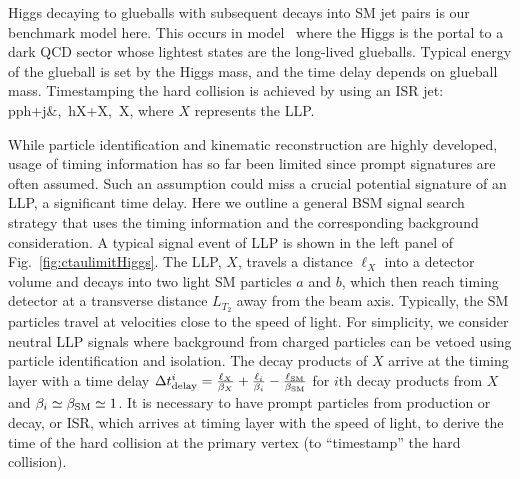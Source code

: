 Higgs decaying to glueballs with subsequent decays into SM jet pairs is our benchmark model here. This occurs in model~\cite{Craig:2015pha} where the Higgs is the portal to a dark QCD sector whose lightest states are the long-lived glueballs. 
Typical energy of the glueball is set by the Higgs mass, and the time delay depends on glueball mass. 
Timestamping the hard collision is achieved by using an ISR jet: 
\bea
pp\rightarrow h+j&,\ h\rightarrow X+X,\ X,   %
\eea
where $X$ represents the LLP.

While particle identification and kinematic reconstruction are highly developed,  
usage of timing information has so far been limited since prompt signatures are often assumed. 
Such an assumption could miss a crucial potential signature of an LLP, a significant time delay. 
Here we outline a general BSM signal search strategy that uses the timing information
and the corresponding background consideration.
A typical signal event of LLP is shown in the left panel of Fig.~\ref{fig:ctaulimitHiggs}. 
The LLP, $X$, travels a distance $\ell_X$ into a detector volume and decays into two light SM particles 
$a$ and $b$, which then reach timing detector at a transverse distance $L_{T_2}$ away from the beam axis. Typically, the SM particles travel at velocities close to the speed of light.
For simplicity, we consider neutral LLP signals where background from charged particles can be vetoed using 
particle identification and isolation.
The decay products of $X$ arrive at the timing layer with a time delay
$
\Delta t^i_{\rm delay} = \frac{\ell_X}{\beta_X} + \frac{\ell_i}{\beta_i} - \frac{\ell_{\rm SM}}{\beta_{\rm SM}}
$
for $i$th decay products from $X$ and $\beta_i \simeq \beta_{\rm SM} \simeq 1 $. 
It is necessary to have prompt particles from production or decay, or ISR, which arrives at timing layer with 
the speed of light, to derive the time of the hard collision at the primary vertex (to ``timestamp'' the hard collision).\\


